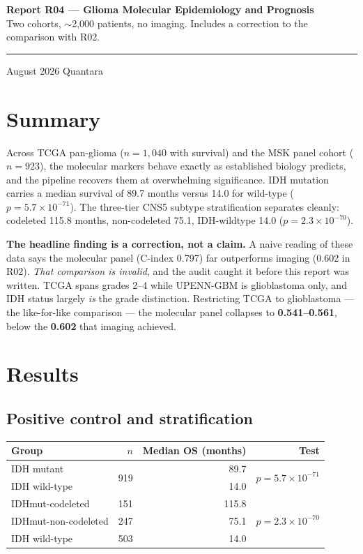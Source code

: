 \documentclass[11pt,a4paper]{article}
\begin{document}
\thispagestyle{empty}
\noindent
{\large\bfseries\color{qnavy} Report R04 --- Glioma Molecular Epidemiology and Prognosis}\\[2pt]
{\color{qgrey}Two cohorts, $\sim$2{,}000 patients, no imaging. Includes a correction to the
comparison with R02.}\\[6pt]
{\color{qgrey}\rule{\textwidth}{0.4pt}}

\medskip
{} August 2026 \quad\textbullet\quad Quantara

\section*{Summary}

Across TCGA pan-glioma ($n=1{,}040$ with survival) and the MSK panel cohort ($n=923$), the
molecular markers behave exactly as established biology predicts, and the pipeline recovers
them at overwhelming significance. IDH mutation carries a median survival of 89.7 months
versus 14.0 for wild-type ($p=5.7\times10^{-71}$). The three-tier CNS5 subtype
stratification separates cleanly: codeleted 115.8 months, non-codeleted 75.1, IDH-wildtype
14.0 ($p=2.3\times10^{-70}$).

\textbf{The headline finding is a correction, not a claim.} A naive reading of these data
says the molecular panel (C-index 0.797) far outperforms imaging (0.602 in R02). \emph{That
comparison is invalid}, and the audit caught it before this report was written. TCGA spans
grades 2--4 while UPENN-GBM is glioblastoma only, and IDH status largely \emph{is} the
grade distinction. Restricting TCGA to glioblastoma --- the like-for-like comparison ---
the molecular panel collapses to \textbf{0.541--0.561}, below the \textbf{0.602} that
imaging achieved.

\section{Results}

\subsection*{Positive control and stratification}

\begin{center}
\begin{tabular}{@{}lrrr@{}}
\toprule
\textbf{Group} & \textbf{$n$} & \textbf{Median OS (months)} & \textbf{Test} \\
\midrule
IDH mutant & \multirow{2}{*}{919} & 89.7 & \multirow{2}{*}{$p=5.7\times10^{-71}$} \\
IDH wild-type & & 14.0 & \\
\midrule
IDHmut-codeleted & 151 & 115.8 & \multirow{3}{*}{$p=2.3\times10^{-70}$} \\
IDHmut-non-codeleted & 247 & 75.1 & \\
IDH wild-type & 503 & 14.0 & \\
\bottomrule
\end{tabular}
\end{center}
\end{document}
